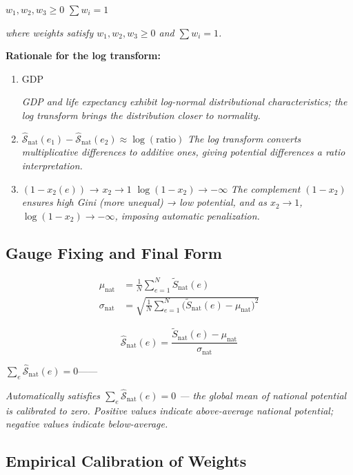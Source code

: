 \documentclass[11pt,a4paper]{article}
\theoremstyle{definition}
\newcommand{\Sopnat}{\hat{\mathcal{S}}_{\text{nat}}}
\begin{document}
 $w_1, w_2, w_3 \geq 0$  $\sum w_i = 1$

\medskip
\noindent\textit{where weights satisfy $w_1, w_2, w_3 \geq 0$ and $\sum w_i = 1$.}

\bigskip
\textbf{ Rationale for the log transform:}

\begin{enumerate}[leftmargin=*]
    \item GDP
    
    \textit{GDP and life expectancy exhibit log-normal distributional characteristics; the log transform brings the distribution closer to normality.}
    
    \item 
    $\Sopnat(e_1) - \Sopnat(e_2) \approx \log(\text{ratio})$
    \textit{The log transform converts multiplicative differences to additive ones, giving potential differences a ratio interpretation.}
    
    \item $(1 - x_2(e))$ →  $x_2 \to 1$
    $\log(1 - x_2) \to -\infty$
    \textit{The complement $(1 - x_2)$ ensures high Gini (more unequal) → low potential, and as $x_2 \to 1$, $\log(1-x_2) \to -\infty$, imposing automatic penalization.}
\end{enumerate}

\subsection{ Gauge Fixing and Final Form}


\begin{align}
    \mu_{\text{nat}} &= \frac{1}{N} \sum_{e=1}^{N} \tilde{S}_{\text{nat}}(e) \\
    \sigma_{\text{nat}} &= \sqrt{\frac{1}{N} \sum_{e=1}^{N} \big(\tilde{S}_{\text{nat}}(e) - \mu_{\text{nat}}\big)^2}
\end{align}


\begin{equation}
    \boxed{\Sopnat(e) = \frac{\tilde{S}_{\text{nat}}(e) - \mu_{\text{nat}}}{\sigma_{\text{nat}}}}
    \label{eq:nat-final}
\end{equation}

\noindent  $\sum_e \Sopnat(e) = 0$——

\textit{Automatically satisfies $\sum_e \Sopnat(e) = 0$ — the global mean of national potential is calibrated to zero. Positive values indicate above-average national potential; negative values indicate below-average.}

\subsection{ Empirical Calibration of Weights}
\end{document}
